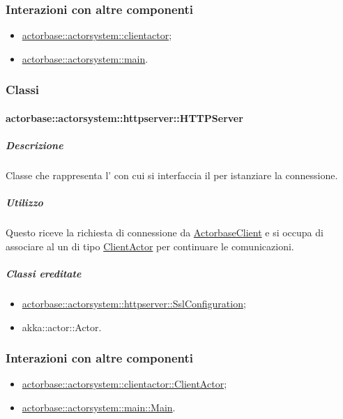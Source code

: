 \documentclass{scalatekids-article}
\begin{document}
\subsubsection{Interazioni con altre componenti}
\begin{itemize}
\item \hyperref[sec:actorbase::actorsystem::clientactor]{actorbase::actorsystem::clientactor};
\item \hyperref[sec:actorbase::actorsystem::main]{actorbase::actorsystem::main}.
\end{itemize}

\subsubsection{Classi}

\paragraph{actorbase::actorsystem::httpserver::HTTPServer}
\label{sec:actorbase::actorsystem::httpserver::HTTPServer}

\subparagraph{Descrizione}
Classe che rappresenta l' con cui si interfaccia il  per
istanziare la connessione.

\subparagraph{Utilizzo}

Questo  riceve la richiesta di connessione da
\hyperref[sec:actorbase::driver::client::ActorbaseClient]{ActorbaseClient}
e si occupa di associare al  un  di tipo
\hyperref[sec:actorbase::actorsystem::clientactor::ClientActor]{ClientActor}
per continuare le comunicazioni.

\subparagraph{Classi ereditate}
\begin{itemize}
\item \hyperref[sec:actorbase::actorsystem::httpserver::SslConfiguration]{actorbase::actorsystem::httpserver::SslConfiguration};
\item akka::actor::Actor.
\end{itemize}

\subsubsection{Interazioni con altre componenti}
\begin{itemize}
\item \hyperref[sec:actorbase::actorsystem::clientactor::ClientActor]{actorbase::actorsystem::clientactor::ClientActor};
\item \hyperref[sec:actorbase::actorsystem::main::Main]{actorbase::actorsystem::main::Main}.
\end{itemize}
\end{document}
